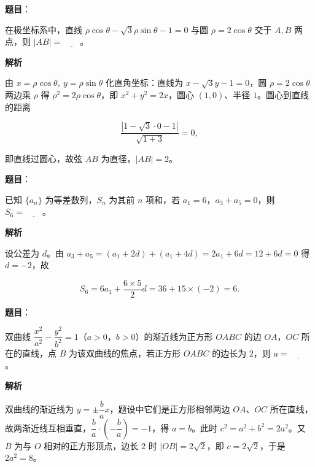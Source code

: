 \begin{answer}

\textbf{题目}：

在极坐标系中，直线 \(\rho\cos\theta-\sqrt{3}\rho\sin\theta-1=0\) 与圆 \(\rho=2\cos\theta\) 交于 \(A,B\) 两点，则 \(|AB|=\underline{\qquad}\)。

\textbf{解析}

由 \(x=\rho\cos\theta,\ y=\rho\sin\theta\) 化直角坐标：直线为 \(x-\sqrt3y-1=0\)，圆 \(\rho=2\cos\theta\) 两边乘 \(\rho\) 得 \(\rho^2=2\rho\cos\theta\)，即 \(x^2+y^2=2x\)，圆心 \((1,0)\)、半径 \(1\)。圆心到直线的距离

\nopagebreak[4]
\[
\frac{|1-\sqrt3\cdot0-1|}{\sqrt{1+3}}=0,
\]

即直线过圆心，故弦 \(AB\) 为直径，\(|AB|=2\)。


\end{answer}
\begin{answer}

\textbf{题目}：

已知 \(\{a_{n}\}\) 为等差数列，\(S_{n}\) 为其前 \(n\) 项和，若 \(a_{1}=6\)，\(a_{3}+a_{5}=0\)，则 \(S_{6}=\underline{\qquad}\)。

\textbf{解析}

设公差为 \(d\)。由 \(a_3+a_5=(a_1+2d)+(a_1+4d)=2a_1+6d=12+6d=0\) 得 \(d=-2\)，故

\nopagebreak[4]
\[
S_6=6a_1+\frac{6\times5}{2}d=36+15\times(-2)=6.
\]


\end{answer}
\begin{answer}

\textbf{题目}：

双曲线 \(\dfrac{x^{2}}{a^{2}}-\dfrac{y^{2}}{b^{2}}=1\)（\(a>0\)，\(b>0\)）的渐近线为正方形 \(OABC\) 的边 \(OA\)，\(OC\) 所在的直线，点 \(B\) 为该双曲线的焦点，若正方形 \(OABC\) 的边长为 \(2\)，则 \(a=\underline{\qquad}\)。

\textbf{解析}

双曲线的渐近线为 \(y=\pm\dfrac ba x\)，题设中它们是正方形相邻两边 \(OA\)、\(OC\) 所在直线，故两渐近线互相垂直，\(\dfrac ba\cdot\left(-\dfrac ba\right)=-1\)，得 \(a=b\)。此时 \(c^2=a^2+b^2=2a^2\)。又 \(B\) 为与 \(O\) 相对的正方形顶点，边长 \(2\) 时 \(|OB|=2\sqrt2\)，即 \(c=2\sqrt2\)，于是 \(2a^2=8\)。


\end{answer}
